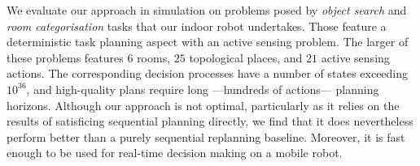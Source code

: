 We evaluate our approach in simulation on problems posed by {\em
object search} and {\em room categorisation} tasks that our indoor
robot undertakes. Those feature a deterministic task planning aspect
with an active sensing problem. The larger of these problems features
$6$ rooms, $25$ topological places, and $21$ active sensing
actions. The corresponding decision processes have a number of states
exceeding $10^{36}$, and high-quality plans require long ---hundreds
of actions--- planning horizons.
Although our approach is not optimal, particularly as it relies on the
results of satisficing sequential planning directly, we find that it
does nevertheless perform better than a purely sequential replanning
baseline. Moreover, it is fast enough to be used for real-time
decision making on a mobile robot.








